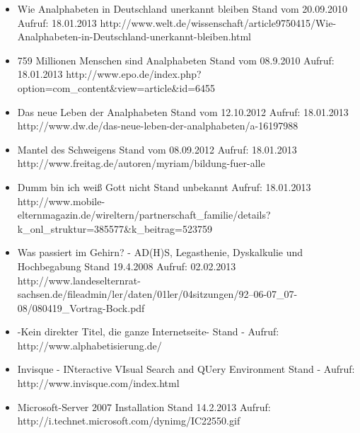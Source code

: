 \begin{itemize}
	\item {}
						{Wie Analphabeten in Deutschland unerkannt bleiben}
						{Stand vom 20.09.2010}
						{Aufruf: 18.01.2013}
						{http://www.welt.de/wissenschaft/article9750415/Wie-Analphabeten-in-Deutschland-unerkannt-bleiben.html}	

	\item {}
						{759 Millionen Menschen sind Analphabeten}
						{Stand vom 08.9.2010}
						{Aufruf: 18.01.2013}
						{http://www.epo.de/index.php?option=com_content&view=article&id=6455}										

	\item {}
						{Das neue Leben der Analphabeten }
						{Stand vom 12.10.2012}
						{Aufruf: 18.01.2013}
						{http://www.dw.de/das-neue-leben-der-analphabeten/a-16197988}										

	\item {}
						{Mantel des Schweigens}
						{Stand vom 08.09.2012}
						{Aufruf: 18.01.2013}
						{http://www.freitag.de/autoren/myriam/bildung-fuer-alle}										

	\item {}
						{Dumm bin ich weiß Gott nicht}
						{Stand unbekannt}
						{Aufruf: 18.01.2013}
						{http://www.mobile-elternmagazin.de/wireltern/partnerschaft_familie/details?k_onl_struktur=385577&k_beitrag=523759}			

										

	\item {}
						{Was passiert im Gehirn? - AD(H)S, Legasthenie, Dyskalkulie und Hochbegabung}
						{Stand 19.4.2008}
						{Aufruf: 02.02.2013}
						{http://www.landeselternrat-sachsen.de/fileadmin/ler/daten/01ler/04sitzungen/92--06-07_07-08/080419_Vortrag-Bock.pdf}
	
	\item {}
						{-Kein direkter Titel, die ganze Internetseite-}
						{Stand -}
						{Aufruf: }
						{http://www.alphabetisierung.de/}
						
	\item \makeSource {-}
						{Invisque - INteractive VIsual Search and QUery Environment}
						{Stand -}
						{Aufruf: }
						{http://www.invisque.com/index.html}
						
	\item {}
						{Microsoft-Server 2007 Installation}
						{Stand 14.2.2013}
						{Aufruf: }
						{http://i.technet.microsoft.com/dynimg/IC22550.gif}
						

\end{itemize}
